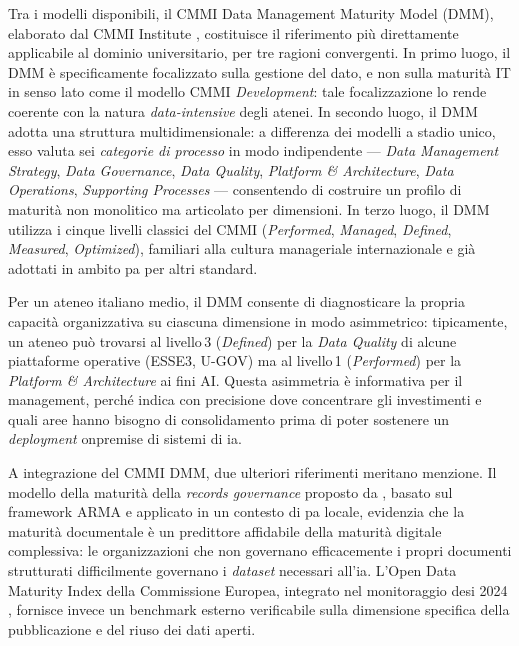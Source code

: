 Tra i modelli disponibili, il CMMI Data Management Maturity Model (DMM),
elaborato dal CMMI Institute \parencite{CMMI}, costituisce il riferimento più
direttamente applicabile al dominio universitario, per tre ragioni convergenti. In primo
luogo, il DMM è specificamente focalizzato sulla gestione del dato, e non sulla maturità
IT in senso lato come il modello CMMI \textit{Development}: tale focalizzazione lo rende
coerente con la natura \textit{data-intensive} degli atenei. In secondo luogo, il DMM
adotta una struttura multidimensionale: a differenza dei modelli a stadio
unico, esso valuta sei \textit{categorie di processo} in modo indipendente ---
\textit{Data Management Strategy}, \textit{Data Governance}, \textit{Data Quality},
\textit{Platform \& Architecture}, \textit{Data Operations}, \textit{Supporting Processes}
--- consentendo di costruire un profilo di maturità non monolitico ma articolato per
dimensioni. In terzo luogo, il DMM utilizza i cinque livelli classici del CMMI
(\textit{Performed}, \textit{Managed}, \textit{Defined}, \textit{Measured},
\textit{Optimized}), familiari alla cultura manageriale internazionale e già adottati in
ambito \gls{pa} per altri standard.

Per un ateneo italiano medio, il DMM consente di diagnosticare la propria capacità
organizzativa su ciascuna dimensione in modo asimmetrico: tipicamente, un ateneo può
trovarsi al livello\,3 (\textit{Defined}) per la \textit{Data Quality} di alcune
piattaforme operative (ESSE3, U-GOV) ma al livello\,1 (\textit{Performed}) per la
\textit{Platform \& Architecture} ai fini AI. Questa asimmetria è informativa per il
management, perché indica con precisione dove concentrare gli investimenti e quali aree
hanno bisogno di consolidamento prima di poter sostenere un \textit{deployment}
\gls{onpremise} di sistemi di \gls{ia}.

A integrazione del CMMI DMM, due ulteriori riferimenti meritano menzione. Il modello della
maturità della \textit{records governance} proposto da
\textcite{Abdallah2026ARMA}, basato sul framework ARMA e applicato in un contesto di \gls{pa}
locale, evidenzia che la maturità documentale è un predittore affidabile della maturità
digitale complessiva: le organizzazioni che non governano efficacemente i propri documenti
strutturati difficilmente governano i \textit{dataset} necessari all'\gls{ia}. L'Open
Data Maturity Index della Commissione Europea, integrato nel monitoraggio \gls{desi} 2024
\parencite{DESI2024}, fornisce invece un benchmark esterno verificabile sulla dimensione
specifica della pubblicazione e del riuso dei dati aperti.

